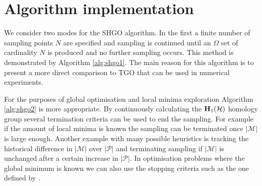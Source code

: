 





\section{Algorithm implementation}
We consider two modes for the SHGO algorithm. In the first a finite number of sampling points $N$ are specified and sampling is continued until an $\Omega$ set of cardinality $N$ is produced and no further sampling occurs. This method is demonstrated by Algorithm \ref{alg:shgo1}. The main reason for this algorithm is to present a more direct comparison to TGO that can be used in numerical experiments.%

For the purposes of global optimisation and local minima exploration Algorithm \ref{alg:shgo2} is more appropriate. By continuously calculating the $\bold{H}_1 (\mathcal{H})$ homology group several termination criteria can be used to end the sampling. For example if the amount of local minima is known the sampling can be terminated once $|\mathcal{M}|$ is large enough. Another example with many possible heuristics is tracking the historical difference in $|\mathcal{M}|$ over $|\mathcal{P}|$ and terminating sampling if $|\mathcal{M}|$ is unchanged after a certain increase in $|\mathcal{P}|$. In optimisation problems where the global minimum is known we can also use the stopping criteria such as the one defined by \cite{Paul2016} . 

